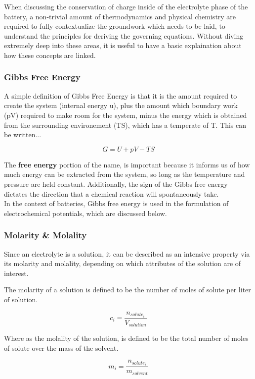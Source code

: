 \documentclass[lettersize,journal]{IEEEtran}
\begin{document}
When discussing the conservation of charge inside of the electrolyte phase of the battery, a non-trivial amount of thermodynamics and physical chemistry are required to fully contextualize the groundwork which needs to be laid, to understand the principles for deriving the governing equations. Without diving extremely deep into these areas, it is useful to have a basic explaination about how these concepts are linked.

\subsubsection{Gibbs Free Energy}
A simple definition of Gibbs Free Energy is that it is the amount required to create the system (internal energy u), plus the amount which boundary work (pV) required to make room for the system, minus the energy which is obtained from the surrounding environement (TS), which has a temperate of T. This can be written...

\[
    G = U + pV - TS
\]

 The \textbf{free energy} portion of the name, is important because it informs us of how much energy can be extracted from the system, so long as the temperature and pressure are held constant. Additionally, the sign of the Gibbs free energy dictates the direction that a chemical reaction will spontaneously take. \\

 In the context of batteries, Gibbs free energy is used in the formulation of electrochemical potentials, which are discussed below.


 \subsubsection{Molarity \& Molality}

 Since an electrolyte is a solution, it can be described as an intensive property via its molarity and molality, depending on which attributes of the solution are of interest.

 The molarity of a solution is defined to be the number of moles of solute per liter of solution.

 \[
    c_i = \frac{n_{solute_i}}{V_{solution}}
 \]

 Where as the molality of the solution, is defined to be the total number of moles of solute over the mass of the solvent.

 \[
    m_i = \frac{n_{solute_i}}{m_{solvent}}
 \]
\end{document}

